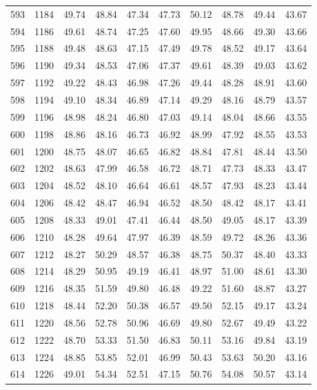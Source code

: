 \begin{longtable}{rrllllllll}
		593 & 1184 & 49.74 & 48.84 & 47.34 & 47.73 & 50.12 & 48.78 & 49.44 & 43.67 \\ 
		594 & 1186 & 49.61 & 48.74 & 47.25 & 47.60 & 49.95 & 48.66 & 49.30 & 43.66 \\ 
		595 & 1188 & 49.48 & 48.63 & 47.15 & 47.49 & 49.78 & 48.52 & 49.17 & 43.64 \\ 
		596 & 1190 & 49.34 & 48.53 & 47.06 & 47.37 & 49.61 & 48.39 & 49.03 & 43.62 \\ 
		597 & 1192 & 49.22 & 48.43 & 46.98 & 47.26 & 49.44 & 48.28 & 48.91 & 43.60 \\ 
		598 & 1194 & 49.10 & 48.34 & 46.89 & 47.14 & 49.29 & 48.16 & 48.79 & 43.57 \\ 
		599 & 1196 & 48.98 & 48.24 & 46.80 & 47.03 & 49.14 & 48.04 & 48.66 & 43.55 \\ 
		600 & 1198 & 48.86 & 48.16 & 46.73 & 46.92 & 48.99 & 47.92 & 48.55 & 43.53 \\ 
		601 & 1200 & 48.75 & 48.07 & 46.65 & 46.82 & 48.84 & 47.81 & 48.44 & 43.50 \\ 
		602 & 1202 & 48.63 & 47.99 & 46.58 & 46.72 & 48.71 & 47.73 & 48.33 & 43.47 \\ 
		603 & 1204 & 48.52 & 48.10 & 46.64 & 46.61 & 48.57 & 47.93 & 48.23 & 43.44 \\ 
		604 & 1206 & 48.42 & 48.47 & 46.94 & 46.52 & 48.50 & 48.42 & 48.17 & 43.41 \\ 
		605 & 1208 & 48.33 & 49.01 & 47.41 & 46.44 & 48.50 & 49.05 & 48.17 & 43.39 \\ 
		606 & 1210 & 48.28 & 49.64 & 47.97 & 46.39 & 48.59 & 49.72 & 48.26 & 43.36 \\ 
		607 & 1212 & 48.27 & 50.29 & 48.57 & 46.38 & 48.75 & 50.37 & 48.40 & 43.33 \\ 
		608 & 1214 & 48.29 & 50.95 & 49.19 & 46.41 & 48.97 & 51.00 & 48.61 & 43.30 \\ 
		609 & 1216 & 48.35 & 51.59 & 49.80 & 46.48 & 49.22 & 51.60 & 48.87 & 43.27 \\ 
		610 & 1218 & 48.44 & 52.20 & 50.38 & 46.57 & 49.50 & 52.15 & 49.17 & 43.24 \\ 
		611 & 1220 & 48.56 & 52.78 & 50.96 & 46.69 & 49.80 & 52.67 & 49.49 & 43.22 \\ 
		612 & 1222 & 48.70 & 53.33 & 51.50 & 46.83 & 50.11 & 53.16 & 49.84 & 43.19 \\ 
		613 & 1224 & 48.85 & 53.85 & 52.01 & 46.99 & 50.43 & 53.63 & 50.20 & 43.16 \\ 
		614 & 1226 & 49.01 & 54.34 & 52.51 & 47.15 & 50.76 & 54.08 & 50.57 & 43.14 \\ 

\end{longtable}
